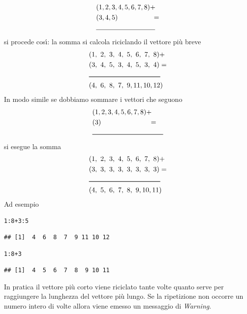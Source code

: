 \documentclass[onecolumn,11pt]{book}\usepackage[]{graphicx}\usepackage[]{color}
\makeatletter
\newcommand{\hlnum}[1]{\textcolor[rgb]{0.686,0.059,0.569}{#1}}%
\newcommand{\hlopt}[1]{\textcolor[rgb]{0,0,0}{#1}}%
\newenvironment{kframe}{%
 \def\at@end@of@kframe{}%
 \ifinner\ifhmode%
  \def\at@end@of@kframe{\end{minipage}}%
  \begin{minipage}{\columnwidth}%
 \fi\fi%
 \def\FrameCommand##1{\hskip\@totalleftmargin \hskip-\fboxsep
 \colorbox{shadecolor}{##1}\hskip-\fboxsep
     \hskip-\linewidth \hskip-\@totalleftmargin \hskip\columnwidth}%
 \MakeFramed {\advance\hsize-\width
   \@totalleftmargin\z@ \linewidth\hsize
   \@setminipage}}%
 {\par\unskip\endMakeFramed%
 \at@end@of@kframe}
\newenvironment{knitrout}{}{} %
\makeatother
\begin{document}
 \begin{align*} &(1,2,3,4,5,6,7,8)+\\ &(3,4,5)\hskip50pt =\\
 &\noindent\rule{0.25\textwidth}{0.4pt}\\
\end{align*}
si procede cos\'\i: la somma
si calcola riciclando il vettore pi\`u breve
 \begin{align}
&(1,~2,~3,~4,~5,~6,~7,~8)+\\
&(3,~4,~5,~3,~4,~5,~3,~4)=\\
&\noindent\rule{0.3\textwidth}{0.8pt} \\
&(4, ~ 6,~  8 ,~ 7,~  9 ,11, 10,12)\\
\end{align}
In modo simile se dobbiamo sommare i vettori che seguono
 \begin{align*} &(1,2,3,4,5,6,7,8)+\\ &(3)\hskip70pt =\\
 &\noindent\rule{0.3\textwidth}{0.6pt}\\
\end{align*}
si esegue la somma
\begin{align}
&(1,~2,~3,~4,~5,~6,~7,~8)+\\
&(3,~3,~3,~3,~3,~3,~3,~3)=\\
&\noindent\rule{0.3\textwidth}{0.8pt} \\
&(4, ~ 5,~  6 ,~ 7,~  8 ,~9, 10,11)\\
\end{align}
Ad esempio
\begin{knitrout}
\color{fgcolor}\begin{kframe}
\begin{alltt}
\hlnum{1}\hlopt{:}\hlnum{8}\hlopt{+}\hlnum{3}\hlopt{:}\hlnum{5}
\end{alltt}


{\ttfamily\noindent\color{warningcolor}{\#\# Warning in 1:8 + 3:5: longer object length is not a multiple of shorter object length}}\begin{verbatim}
## [1]  4  6  8  7  9 11 10 12
\end{verbatim}
\begin{alltt}
\hlnum{1}\hlopt{:}\hlnum{8}\hlopt{+}\hlnum{3}
\end{alltt}
\begin{verbatim}
## [1]  4  5  6  7  8  9 10 11
\end{verbatim}
\end{kframe}
\end{knitrout}
In pratica il vettore pi\`u corto viene riciclato tante volte quanto serve per raggiungere la lunghezza del vettore pi\`u lungo. Se la ripetizione non occorre un numero intero di volte allora viene emesso un messaggio di \textit{Warning}.
\end{document}
